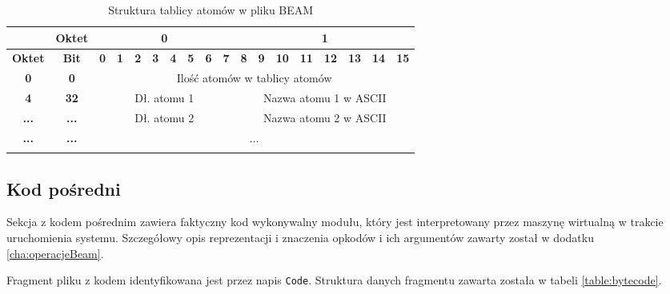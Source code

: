 \begin{longtable}{|c|c|c|c|c|c|c|c|c|c|c|c|c|c|c|c|c|c|}
\hline
         & \textbf{Oktet} & \multicolumn{8}{|c|}{\textbf{0}} & \multicolumn{8}{|c|}{\textbf{1}} \\
\hline
\textbf{Oktet} & \textbf{Bit} & \textbf{0} & \textbf{1} & \textbf{2} & \textbf{3} & \textbf{4} & \textbf{5} & \textbf{6} & \textbf{7} & \textbf{8} & \textbf{9} & \textbf{10} & \textbf{11} & \textbf{12} & \textbf{13} & \textbf{14} & \textbf{15}\\
\hline
\textbf{0} & \textbf{0} & \multicolumn{16}{|c|}{Ilość atomów w tablicy atomów} \\[3ex]
\hline
\textbf{4} & \textbf{32} & \multicolumn{8}{|c|}{Dł. atomu 1} & \multicolumn{8}{|c|}{Nazwa atomu 1 w ASCII}\\[3ex]
\hline
\textbf{...} & \textbf{...} & \multicolumn{8}{|c|}{Dł. atomu 2} & \multicolumn{8}{|c|}{Nazwa atomu 2 w ASCII}\\[3ex]
\hline
\textbf{...} & \textbf{...} & \multicolumn{16}{|c|}{...} \\[3ex]
\hline
\caption{Struktura tablicy atomów w pliku BEAM}
\label{table:atomTable} \\
\end{longtable}

\subsection{Kod pośredni}
Sekcja z kodem pośrednim zawiera faktyczny kod wykonywalny modułu, który jest interpretowany przez maszynę wirtualną w trakcie uruchomienia systemu.
Szczegółowy opis reprezentacji i znaczenia opkodów i ich argumentów zawarty został w dodatku \ref{cha:operacjeBeam}.

Fragment pliku z kodem identyfikowana jest przez napis \texttt{Code}. Struktura danych fragmentu zawarta została w tabeli \ref{table:bytecode}. 

